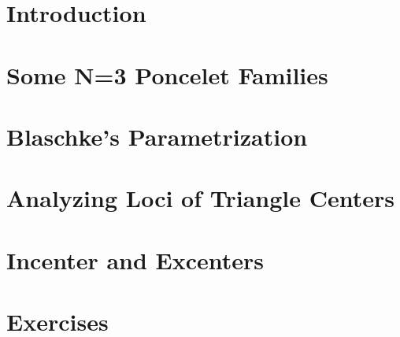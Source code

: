 \section{Introduction}
\label{sec:03-intro}


\section{Some N=3 Poncelet Families}
\label{sec:03-families}


\section{Blaschke's Parametrization}
\label{sec:03-blaschke}


\section{Analyzing Loci of Triangle Centers}
\label{sec:03-loci}


\section{Incenter and Excenters}
\label{sec:03-inc-exc}


\section{Exercises}
\label{sec:03-exercises}

